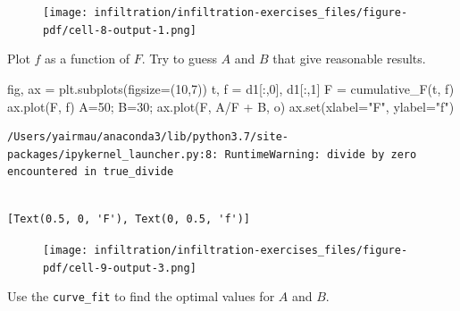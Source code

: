 \documentclass[
  letterpaper,
  DIV=11,
  numbers=noendperiod]{scrreprt}
\newenvironment{Shaded}{\begin{snugshade}}{\end{snugshade}}
\newcommand{\BuiltInTok}[1]{\textcolor[rgb]{0.00,0.23,0.31}{#1}}
\newcommand{\DecValTok}[1]{\textcolor[rgb]{0.68,0.00,0.00}{#1}}
\newcommand{\NormalTok}[1]{\textcolor[rgb]{0.00,0.23,0.31}{#1}}
\newcommand{\OperatorTok}[1]{\textcolor[rgb]{0.37,0.37,0.37}{#1}}
\newcommand{\StringTok}[1]{\textcolor[rgb]{0.13,0.47,0.30}{#1}}
\begin{document}
\begin{figure}[H]

{\centering \texttt{[image: infiltration/infiltration-exercises\_files/figure-pdf/cell-8-output-1.png]}

}

\end{figure}

Plot \(f\) as a function of \(F\). Try to guess \(A\) and \(B\) that
give reasonable results.

\begin{Shaded}
\begin{Highlighting}[]
\NormalTok{fig, ax }\OperatorTok{=}\NormalTok{ plt.subplots(figsize}\OperatorTok{=}\NormalTok{(}\DecValTok{10}\NormalTok{,}\DecValTok{7}\NormalTok{))}
\NormalTok{t, f }\OperatorTok{=}\NormalTok{ d1[:,}\DecValTok{0}\NormalTok{], d1[:,}\DecValTok{1}\NormalTok{]}
\NormalTok{F }\OperatorTok{=}\NormalTok{ cumulative\_F(t, f)}
\NormalTok{ax.plot(F, f)}
\NormalTok{A}\OperatorTok{=}\DecValTok{50}\OperatorTok{;}\NormalTok{ B}\OperatorTok{=}\DecValTok{30}\OperatorTok{;}
\NormalTok{ax.plot(F, A}\OperatorTok{/}\NormalTok{F }\OperatorTok{+}\NormalTok{ B, }\StringTok{\textquotesingle{}o\textquotesingle{}}\NormalTok{)}
\NormalTok{ax.}\BuiltInTok{set}\NormalTok{(xlabel}\OperatorTok{=}\StringTok{"F"}\NormalTok{,}
\NormalTok{       ylabel}\OperatorTok{=}\StringTok{"f"}\NormalTok{)}
\end{Highlighting}
\end{Shaded}

\begin{verbatim}
/Users/yairmau/anaconda3/lib/python3.7/site-packages/ipykernel_launcher.py:8: RuntimeWarning: divide by zero encountered in true_divide
  
\end{verbatim}

\begin{verbatim}
[Text(0.5, 0, 'F'), Text(0, 0.5, 'f')]
\end{verbatim}

\begin{figure}[H]

{\centering \texttt{[image: infiltration/infiltration-exercises\_files/figure-pdf/cell-9-output-3.png]}

}

\end{figure}

Use the \texttt{curve\_fit} to find the optimal values for \(A\) and
\(B\).
\end{document}
